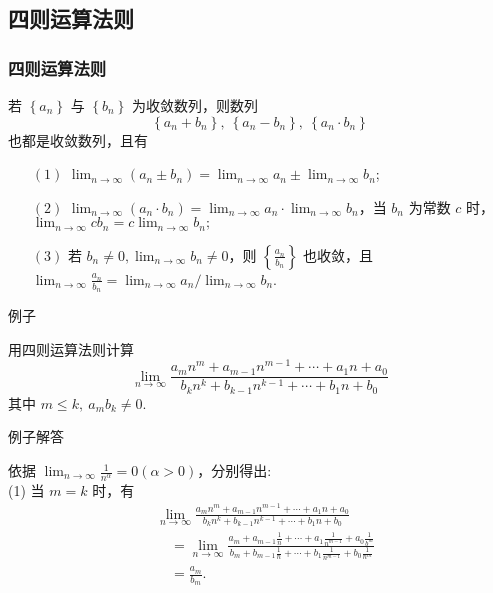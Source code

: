 \documentclass[mathserif]{beamer}
\begin{document}
\subsection{四则运算法则}

\begin{frame}[label=szys]
\frametitle{四则运算法则\hfill\hyperlink{szyszm<1>}{}}
	\begin{thm}
	\suojin 若 $\left\{a_n\right\}$ 与 $\left\{b_n\right\}$ 为收敛数列，则数列 $$\left\{a_n+b_n\right\},\ \left\{a_n-b_n\right\},\ \left\{a_n \cdot b_n\right\}$$ 
	也都是收敛数列，且有
	\begin{enumerate}
		\item[{\color{black}$(1)$}] $\lim _{n \rightarrow \infty}\left(a_n \pm b_n\right)=\lim _{n \rightarrow \infty} a_n \pm \lim _{n \rightarrow \infty} b_n$;
		\item[{\color{black}$(2)$}]  $\lim _{n \rightarrow \infty}\left(a_n \cdot b_n\right)=\lim _{n \rightarrow \infty} a_n \cdot \lim _{n \rightarrow \infty} b_n$，当 $b_n$ 为常数 $c$ 时，$\lim _{n \rightarrow \infty} c b_n=c \lim _{n \rightarrow \infty} b_n;$
		\item[{\color{black}$(3)$}] 若 $b_n \neq 0, \lim _{n \rightarrow \infty} b_n \neq 0$，则 $\left\{\frac{a_n}{b_n}\right\}$ 也收敛，且 $\lim _{n \rightarrow \infty} \frac{a_n}{b_n}=\lim _{n \rightarrow \infty} a_n / \lim _{n \rightarrow \infty} b_n$. 
	\end{enumerate}
	\end{thm}
\end{frame}



\begin{frame}{例子}%
	\begin{ex}
		\suojin 用四则运算法则计算
		$$
		\lim _{n \rightarrow \infty} \frac{a_m n^m+a_{m-1} n^{m-1}+\cdots+a_1 n+a_0}{b_k n^k+b_{k-1} n^{k-1}+\cdots+b_1 n+b_0}
		$$
		其中 $m \leq k,\  a_m b_k \neq 0$.
	\end{ex}
	
\end{frame}



\begin{frame}{例子解答}%
	\begin{jie} 
		\suojin 依据 $\lim _{n \rightarrow \infty} \frac{1}{n^\alpha}=0(\alpha>0)$，分别得出:\\
		\suojin 
		(1) 当 $m=k$ 时，有  
		$$
		\begin{aligned}
			& \lim _{n \rightarrow \infty} \frac{a_m n^m+a_{m-1} n^{m-1}+\cdots+a_1 n+a_0}{b_k n^k+b_{k-1} n^{k-1}+\cdots+b_1 n+b_0} \\
			& \quad=\lim _{n \rightarrow \infty} \frac{a_m+a_{m-1} \frac{1}{n}+\cdots+a_1 \frac{1}{n^{m-1}}+a_0 \frac{1}{b^m}}{b_m+b_{m-1} \frac{1}{n}+\cdots+b_1 \frac{1}{n^{m-1}}+b_0 \frac{1}{n^m}} \\
			& \quad=\frac{a_m}{b_m} .
		\end{aligned}$$		
	\end{jie}
	
\end{frame}
\end{document}
